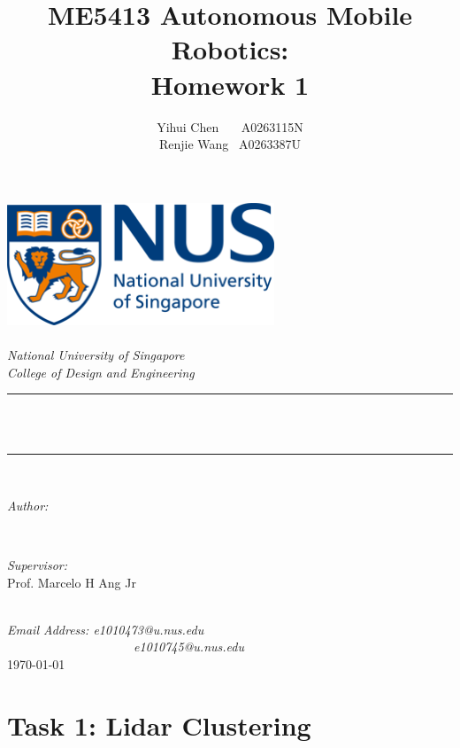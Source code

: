 \documentclass[10pt]{article}
\title{ME5413 Autonomous Mobile Robotics: \\ Homework 1}
\author{\textup{Yihui Chen \ \ \ A0263115N \\ Renjie Wang \ A0263387U }}
\theoremstyle{nonumberplain}
\begin{document}
	\begin{titlepage}
		\center
		\newcommand{\HRule}{\rule{\linewidth}{0.5mm}}
		\includegraphics[width=8cm]{logo.png}\\[1cm] 
		\quad\\[2cm]
		\textsl{\Large National University of Singapore}\\[0.5cm] 
		\textsl{\large College of Design and Engineering}\\[0.5cm]
		\makeatletter
		\HRule \\[0.4cm]
		{ \huge \bfseries \@title}\\[0.4cm] 
		\HRule \\[2cm]
		\begin{minipage}{0.4\textwidth}
			\begin{flushleft} \large
				\emph{Author:}\\
				\@author 
			\end{flushleft}
		\end{minipage}
		~
		\begin{minipage}{0.4\textwidth}
			\begin{flushright} \large
				\emph{Supervisor:} \\
				\textup{Prof. Marcelo H Ang Jr}
			\end{flushright}
		\end{minipage}\\[3cm]
		\makeatother
		{\large \emph{Email Address: e1010473@u.nus.edu \\	\ \ \ \ \ \ \ \ \ \ \ \ \ \ \ \ \ \ \ \ e1010745@u.nus.edu}}\\[0.5cm]
		{\large \today}\\[2cm] 
		\vfill 
	\end{titlepage}

\section{Task 1: Lidar Clustering}

\hspace{1.0em}
\end{document}

